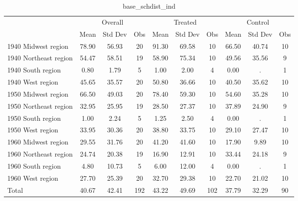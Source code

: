 \begin{table}[htbp]\centering
\def\sym#1{\ifmmode^{#1}\else\(^{#1}\)\fi}
\caption{base\_schdist\_ind \label{tab1}}
\begin{tabular}{l*{3}{ccc}}
\toprule
                    &\multicolumn{3}{c}{Overall}           &\multicolumn{3}{c}{Treated}           &\multicolumn{3}{c}{Control}           \\
                    &        Mean&     Std Dev&         Obs&        Mean&     Std Dev&         Obs&        Mean&     Std Dev&         Obs\\
\midrule
1940 Midwest region &       78.90&       56.93&          20&       91.30&       69.58&          10&       66.50&       40.74&          10\\
1940 Northeast region&       54.47&       58.51&          19&       58.90&       75.34&          10&       49.56&       35.56&           9\\
1940 South region   &        0.80&        1.79&           5&        1.00&        2.00&           4&        0.00&           .&           1\\
1940 West region    &       45.65&       35.57&          20&       50.80&       36.66&          10&       40.50&       35.62&          10\\
1950 Midwest region &       66.50&       49.03&          20&       78.40&       59.30&          10&       54.60&       35.28&          10\\
1950 Northeast region&       32.95&       25.95&          19&       28.50&       27.37&          10&       37.89&       24.90&           9\\
1950 South region   &        1.00&        2.24&           5&        1.25&        2.50&           4&        0.00&           .&           1\\
1950 West region    &       33.95&       30.36&          20&       38.80&       33.75&          10&       29.10&       27.47&          10\\
1960 Midwest region &       29.55&       31.76&          20&       41.20&       41.60&          10&       17.90&        9.89&          10\\
1960 Northeast region&       24.74&       20.38&          19&       16.90&       12.91&          10&       33.44&       24.18&           9\\
1960 South region   &        4.80&       10.73&           5&        6.00&       12.00&           4&        0.00&           .&           1\\
1960 West region    &       27.70&       25.39&          20&       32.70&       29.38&          10&       22.70&       21.02&          10\\
Total               &       40.67&       42.41&         192&       43.22&       49.69&         102&       37.79&       32.29&          90\\
\bottomrule
\end{tabular}
\end{table}
